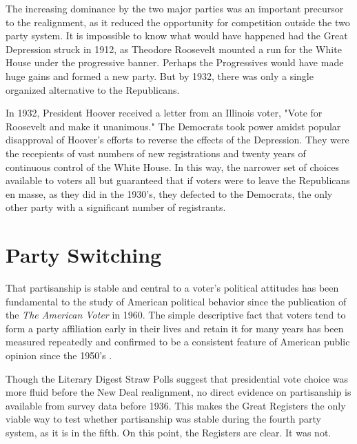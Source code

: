 \documentclass[11pt]{scrartcl}\usepackage[]{graphicx}\usepackage[]{color}
\begin{document}
The increasing dominance by the two major parties was an important precursor to the realignment, as it reduced the opportunity for competition outside the two party system.  It is impossible to know what would have happened had the Great Depression struck in 1912, as Theodore Roosevelt mounted a run for the White House under the progressive banner. Perhaps the Progressives would have made huge gains and formed a new party.  But by 1932, there was only a single organized alternative to the Republicans. 

In 1932, President Hoover received a letter from an Illinois voter, "Vote for Roosevelt and make it unanimous." The Democrats took power amidst popular disapproval of Hoover's efforts to reverse the effects of the Depression. They were the recepients of vast numbers of new registrations and twenty years of continuous control of the White House. In this way, the narrower set of choices available to voters all but guaranteed that if voters were to leave the Republicans en masse, as they did in the 1930's, they defected to the Democrats, the only other party with a significant number of registrants.




\section*{Party Switching}



That partisanship is stable and central to a voter's political attitudes has been fundamental to the study of American political behavior since the publication of the \emph{The American Voter} in 1960. The simple descriptive fact that voters tend to form a party affiliation early in their lives and retain it for many years has been measured repeatedly and confirmed to be a consistent feature of American public opinion since the 1950's \citep{green1994stable, clarke2009dynamics}. 

Though the Literary Digest Straw Polls suggest that presidential vote choice was more fluid before the New Deal realignment, no direct evidence on partisanship is available from survey data before 1936. This makes the Great Registers the only viable way to test whether partisanship was stable during the fourth party system, as it is in the fifth. On this point, the Registers are clear. It was not.
\end{document}
